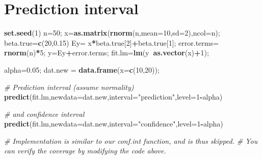 \documentclass[12pt,]{book}
\newenvironment{Shaded}{\begin{snugshade}}{\end{snugshade}}
\newcommand{\KeywordTok}[1]{\textcolor[rgb]{0.13,0.29,0.53}{\textbf{#1}}}
\newcommand{\DataTypeTok}[1]{\textcolor[rgb]{0.13,0.29,0.53}{#1}}
\newcommand{\DecValTok}[1]{\textcolor[rgb]{0.00,0.00,0.81}{#1}}
\newcommand{\FloatTok}[1]{\textcolor[rgb]{0.00,0.00,0.81}{#1}}
\newcommand{\StringTok}[1]{\textcolor[rgb]{0.31,0.60,0.02}{#1}}
\newcommand{\CommentTok}[1]{\textcolor[rgb]{0.56,0.35,0.01}{\textit{#1}}}
\newcommand{\OperatorTok}[1]{\textcolor[rgb]{0.81,0.36,0.00}{\textbf{#1}}}
\newcommand{\NormalTok}[1]{#1}
\begin{document}
\section{Prediction interval}\label{prediction-interval}

\begin{Shaded}
\begin{Highlighting}[]
\KeywordTok{set.seed}\NormalTok{(}\DecValTok{1}\NormalTok{)}
\NormalTok{n=}\DecValTok{50}\NormalTok{;}
\NormalTok{x=}\KeywordTok{as.matrix}\NormalTok{(}\KeywordTok{rnorm}\NormalTok{(n,}\DataTypeTok{mean=}\DecValTok{10}\NormalTok{,}\DataTypeTok{sd=}\DecValTok{2}\NormalTok{),}\DataTypeTok{ncol=}\NormalTok{n);}
\NormalTok{beta.true=}\KeywordTok{c}\NormalTok{(}\DecValTok{20}\NormalTok{,}\FloatTok{0.15}\NormalTok{)}
\NormalTok{Ey=}\StringTok{ }\NormalTok{x}\OperatorTok{*}\NormalTok{beta.true[}\DecValTok{2}\NormalTok{]}\OperatorTok{+}\NormalTok{beta.true[}\DecValTok{1}\NormalTok{];}
\NormalTok{error.terms=}\StringTok{ }\KeywordTok{rnorm}\NormalTok{(n)}\OperatorTok{*}\DecValTok{5}\NormalTok{;}
\NormalTok{y=Ey}\OperatorTok{+}\NormalTok{error.terms;}
\NormalTok{fit.lm=}\KeywordTok{lm}\NormalTok{(y}\OperatorTok{~}\KeywordTok{as.vector}\NormalTok{(x)}\OperatorTok{+}\DecValTok{1}\NormalTok{);}

\NormalTok{alpha=}\FloatTok{0.05}\NormalTok{;}
\NormalTok{dat.new =}\StringTok{ }\KeywordTok{data.frame}\NormalTok{(}\DataTypeTok{x=}\KeywordTok{c}\NormalTok{(}\DecValTok{10}\NormalTok{,}\DecValTok{20}\NormalTok{));}

\CommentTok{# Prediction interval (assume normality)}
\KeywordTok{predict}\NormalTok{(fit.lm,}\DataTypeTok{newdata=}\NormalTok{dat.new,}\DataTypeTok{interval=}\StringTok{"prediction"}\NormalTok{,}\DataTypeTok{level=}\DecValTok{1}\OperatorTok{-}\NormalTok{alpha)}

\CommentTok{# and confidence interval}
\KeywordTok{predict}\NormalTok{(fit.lm,}\DataTypeTok{newdata=}\NormalTok{dat.new,}\DataTypeTok{interval=}\StringTok{"confidence"}\NormalTok{,}\DataTypeTok{level=}\DecValTok{1}\OperatorTok{-}\NormalTok{alpha)}
\end{Highlighting}
\end{Shaded}

\begin{Shaded}
\begin{Highlighting}[]
\CommentTok{# Implementation is similar to our conf.int function, and is thus skipped.}
\CommentTok{# You can verify the coverage by modifying the code above.}
\end{Highlighting}
\end{Shaded}
\end{document}
